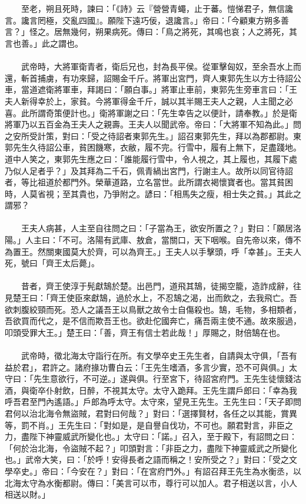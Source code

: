 \\\\
　　至老，朔且死時，諫曰：「《詩》云『營營青蠅，止于蕃。愷悌君子，無信讒言。讒言罔極，交亂四國』。願陛下遠巧佞，退讒言。」帝曰：「今顧東方朔多善言？」怪之。居無幾何，朔果病死。傳曰：「鳥之將死，其鳴也哀；人之將死，其言也善。」此之謂也。
\\\\
　　武帝時，大將軍衛青者，衛后兄也，封為長平侯。從軍擊匈奴，至余吾水上而還，斬首捕虜，有功來歸，詔賜金千斤。將軍出宮門，齊人東郭先生以方士待詔公車，當道遮衛將軍車，拜謁曰：「願白事。」將軍止車前，東郭先生旁車言曰：「王夫人新得幸於上，家貧。今將軍得金千斤，誠以其半賜王夫人之親，人主聞之必喜。此所謂奇策便計也。」衛將軍謝之曰：「先生幸告之以便計，請奉教。」於是衛將軍乃以五百金為王夫人之親壽。王夫人以聞武帝。帝曰：「大將軍不知為此。」問之安所受計策，對曰：「受之待詔者東郭先生。」詔召東郭先生，拜以為郡都尉。東郭先生久待詔公車，貧困饑寒，衣敝，履不完。行雪中，履有上無下，足盡踐地。道中人笑之，東郭先生應之曰：「誰能履行雪中，令人視之，其上履也，其履下處乃似人足者乎？」及其拜為二千石，佩青緺出宮門，行謝主人。故所以同官待詔者，等比祖道於都門外。榮華道路，立名當世。此所謂衣褐懷寶者也。當其貧困時，人莫省視；至其貴也，乃爭附之。諺曰：「相馬失之瘦，相士失之貧。」其此之謂邪？
\\\\
　　王夫人病甚，人主至自往問之曰：「子當為王，欲安所置之？」對曰：「願居洛陽。」人主曰：「不可。洛陽有武庫、敖倉，當關口，天下咽喉。自先帝以來，傳不為置王。然關東國莫大於齊，可以為齊王。」王夫人以手擊頭，呼「幸甚」。王夫人死，號曰「齊王太后薨」。
\\\\
　　昔者，齊王使淳于髡獻鵠於楚。出邑門，道飛其鵠，徒揭空籠，造詐成辭，往見楚王曰：「齊王使臣來獻鵠，過於水上，不忍鵠之渴，出而飲之，去我飛亡。吾欲刺腹絞頸而死。恐人之議吾王以鳥獸之故令士自傷殺也。鵠，毛物，多相類者，吾欲買而代之，是不信而欺吾王也。欲赴佗國奔亡，痛吾兩主使不通。故來服過，叩頭受罪大王。」楚王曰：「善，齊王有信士若此哉！」厚賜之，財倍鵠在也。
\\\\
　　武帝時，徵北海太守詣行在所。有文學卒史王先生者，自請與太守俱，「吾有益於君」，君許之。諸府掾功曹白云：「王先生嗜酒，多言少實，恐不可與俱。」太守曰：「先生意欲行，不可逆。」遂與俱。行至宮下，待詔宮府門。王先生徒懷錢沽酒，與衛卒仆射飲，日醉，不視其太守。太守入跪拜。王先生謂戶郎曰：「幸為我呼吾君至門內遙語。」戶郎為呼太守。太守來，望見王先生。王先生曰：「天子即問君何以治北海令無盜賊，君對曰何哉？」對曰：「選擇賢材，各任之以其能，賞異等，罰不肖。」王先生曰：「對如是，是自譽自伐功，不可也。願君對言，非臣之力，盡陛下神靈威武所變化也。」太守曰：「諾。」召入，至于殿下，有詔問之曰：「何於治北海，令盜賊不起？」叩頭對言：「非臣之力，盡陛下神靈威武之所變化也。」武帝大笑，曰：「於呼！安得長者之語而稱之！安所受之？」對曰：「受之文學卒史。」帝曰：「今安在？」對曰：「在宮府門外。」有詔召拜王先生為水衡丞，以北海太守為水衡都尉。傳曰：「美言可以市，尊行可以加人。君子相送以言，小人相送以財。」

